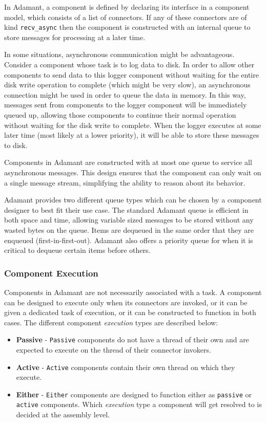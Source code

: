 In Adamant, a component is defined by declaring its interface in a component model, which consists of a list of connectors. If any of these connectors are of kind \texttt{recv\_async} then the component is constructed with an internal queue to store messages for processing at a later time. 

In some situations, asynchronous communication might be advantageous. Consider a component whose task is to log data to disk. In order to allow other components to send data to this logger component without waiting for the entire disk write operation to complete (which might be very slow), an asynchronous connection might be used in order to queue the data in memory. In this way, messages sent from components to the logger component will be immediately queued up, allowing those components to continue their normal operation without waiting for the disk write to complete. When the logger executes at some later time (most likely at a lower priority), it will be able to store these messages to disk.

Components in Adamant are constructed with at most one queue to service all asynchronous messages. This design ensures that the component can only wait on a single message stream, simplifying the ability to reason about its behavior. 

Adamant provides two different queue types which can be chosen by a component designer to best fit their use case. The standard Adamant queue is efficient in both space and time, allowing variable sized messages to be stored without any wasted bytes on the queue. Items are dequeued in the same order that they are enqueued (first-in-first-out). Adamant also offers a priority queue for when it is critical to dequeue certain items before others.

\subsubsection{Component Execution}

Components in Adamant are not necessarily associated with a task. A component can be designed to execute only when its connectors are invoked, or it can be given a dedicated task of execution, or it can be constructed to function in both cases. The different component \textit{execution} types are described below:

\begin{itemize}
  \item \textbf{Passive} - \texttt{Passive} components do not have a thread of their own and are expected to execute on the thread of their connector invokers.
  \item \textbf{Active} - \texttt{Active} components contain their own thread on which they execute.
  \item \textbf{Either} - \texttt{Either} components are designed to function either as \texttt{passive} or \texttt{active} components. Which \textit{execution} type a component will get resolved to is decided at the assembly level.
\end{itemize}

